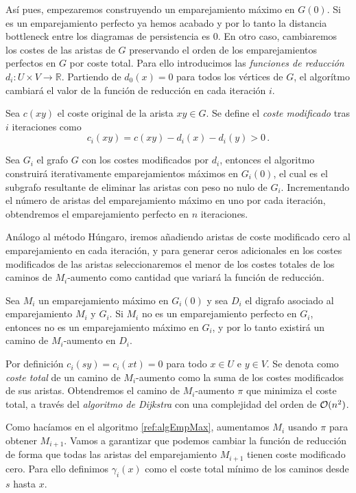 Así pues, empezaremos construyendo un emparejamiento máximo en $G(0)$. Si es un emparejamiento perfecto ya hemos acabado y por lo tanto la distancia bottleneck entre los diagramas de persistencia es $0$. En otro caso, cambiaremos los costes de las aristas de $G$ preservando el orden de los emparejamientos perfectos en $G$ por coste total. Para ello introducimos las \emph{funciones de reducción} $d_i: U \times V \to \mathbb{R}$. Partiendo de $d_0(x)=0$ para todos los vértices de $G$, el algorítmo cambiará el valor de la función de reducción en cada iteración $i$.

\begin{definition}
Sea $c(xy)$ el coste original de la arista $xy \in G$. Se define el \emph{coste modificado} tras $i$ iteraciones como
\[
c_i(xy) = c(xy) - d_i(x) - d_i(y) > 0\,.
\]
\end{definition}

Sea $G_i$ el grafo $G$ con los costes modificados por $d_i$, entonces el algoritmo construirá iterativamente emparejamientos máximos en $G_i(0)$, el cual es el subgrafo resultante de eliminar las aristas con peso no nulo de $G_i$. Incrementando el número de aristas del emparejamiento máximo en uno por cada iteración, obtendremos el emparejamiento perfecto en $n$ iteraciones.

Análogo al método Húngaro, iremos añadiendo aristas de coste modificado cero al emparejamiento en cada iteración, y para generar ceros adicionales en los costes modificados de las aristas seleccionaremos el menor de los costes totales de los caminos de $M_i$-aumento como cantidad que variará la función de reducción.

Sea $M_i$ un emparejamiento máximo en $G_i(0)$ y sea $D_i$ el digrafo asociado al emparejamiento $M_i$ y $G_i$. Si $M_i$ no es un emparejamiento perfecto en $G_i$, entonces no es un emparejamiento máximo en $G_i$, y por lo tanto existirá un camino de $M_i$-aumento en $D_i$.

Por definición $c_i(sy) = c_i(xt) = 0$ para todo $x \in U$ e $y \in V$. Se denota como \emph{coste total} de un camino de $M_i$-aumento como la suma de los costes modificados de sus aristas. Obtendremos el camino de $M_i$-aumento $\pi$ que minimiza el coste total, a través del \emph{algoritmo de Dijkstra} con una complejidad del orden de $\mathcal{O}(n^2)$.

Como hacíamos en el algoritmo \ref{ref:algEmpMax}, aumentamos $M_i$ usando $\pi$ para obtener $M_{i+1}$. Vamos a garantizar que podemos cambiar la función de reducción de forma que todas las aristas del emparejamiento $M_{i+1}$ tienen coste modificado cero. Para ello definimos $\gamma_i(x)$ como el coste total mínimo de los caminos desde $s$ hasta $x$.

